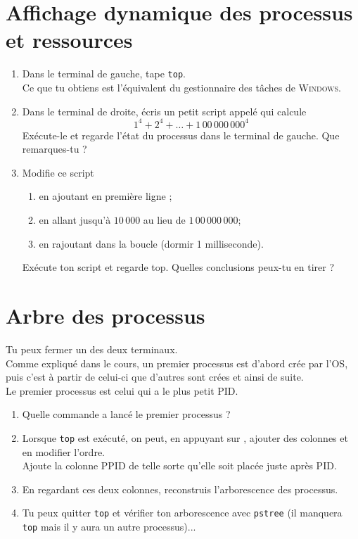 \documentclass[a4paper,12pt,french]{book}
\begin{document}
\section*{Affichage dynamique des processus et ressources}
\begin{enumerate}[\bfseries 1.]
	\item Dans le terminal de gauche, tape \texttt{top}.\\
     Ce que tu obtiens est l'équivalent du gestionnaire des tâches de \textsc{Windows}.\\
     \item Dans le terminal de droite, écris un petit script appelé  qui calcule
     $$1^4+2^4+\ldots+1\,00\,000\,000^4$$
     Exécute-le et regarde l'état du processus dans le terminal de gauche. Que remarques-tu ?
     \item Modifie ce script
     \begin{enumerate}[--]
     	\item en ajoutant en première ligne ;
         \item en allant jusqu'à $10\,000$ au lieu de $1\,00\,000\,000$;
         \item en rajoutant dans la boucle  (dormir 1 milliseconde).
     \end{enumerate}
     Exécute ton script et regarde top. Quelles conclusions peux-tu en tirer ?
\end{enumerate}
\section*{Arbre des processus}
Tu peux fermer un des deux terminaux.\\

Comme expliqué dans le cours, un premier processus est d'abord crée par l'OS, puis c'est à partir de celui-ci que d'autres sont crées et ainsi de suite.\\
Le premier processus est celui qui a le plus petit PID.\\
\begin{enumerate}[\bfseries 1.]
	\item 	Quelle commande a lancé le premier processus ?
	\item 	Lorsque \texttt{top} est exécuté, on peut, en appuyant sur  , ajouter des colonnes et en modifier l'ordre.\\
            Ajoute la colonne PPID de telle sorte qu'elle soit placée juste après PID.
     \item 	En regardant ces deux colonnes, reconstruis l'arborescence des processus.
     \item 	Tu peux quitter \texttt{top} et vérifier ton arborescence avec \texttt{pstree} (il manquera \texttt{top} mais il y aura un autre processus)...
     \end{enumerate}
\end{document}
